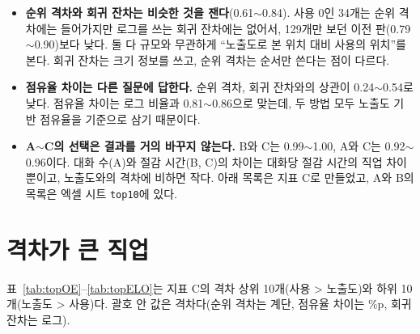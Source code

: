 \documentclass[11pt]{article}
\begin{document}
\begin{itemize}[leftmargin=*]
  \item \textbf{순위 격차와 회귀 잔차는 비슷한 것을 잰다}(0.61$\sim$0.84). 사용 0인 34개는 순위 격차에는 들어가지만 로그를 쓰는 회귀 잔차에는 없어서, 129개만 보던 이전 판(0.79$\sim$0.90)보다 낮다. 둘 다 규모와 무관하게 ``노출도로 본 위치 대비 사용의 위치''를 본다. 회귀 잔차는 크기 정보를 쓰고, 순위 격차는 순서만 쓴다는 점이 다르다.
  \item \textbf{점유율 차이는 다른 질문에 답한다.} 순위 격차, 회귀 잔차와의 상관이 0.24$\sim$0.54로 낮다. 점유율 차이는 로그 비율과 0.81$\sim$0.86으로 맞는데, 두 방법 모두 노출도 기반 점유율을 기준으로 삼기 때문이다.
  \item \textbf{A$\sim$C의 선택은 결과를 거의 바꾸지 않는다.} B와 C는 0.99$\sim$1.00, A와 C는 0.92$\sim$0.96이다. 대화 수(A)와 절감 시간(B, C)의 차이는 대화당 절감 시간의 직업 차이뿐이고, 노출도와의 격차에 비하면 작다. 아래 목록은 지표 C로 만들었고, A와 B의 목록은 엑셀 시트 \texttt{top10}에 있다.
\end{itemize}

\section{격차가 큰 직업}

표~\ref{tab:topOE}--\ref{tab:topELO}는 지표 C의 격차 상위 10개(사용 > 노출도)와 하위 10개(노출도 > 사용)다. 괄호 안 값은 격차다(순위 격차는 계단, 점유율 차이는 \%p, 회귀 잔차는 로그).
\end{document}
